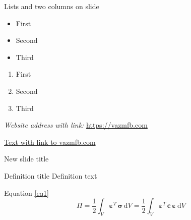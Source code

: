 \documentclass[12pt]{beamer}
\newcommand{\diff}[1]{\mathrm{d}#1}
\begin{document}
\begin{frame}{}
Lists and two columns on slide

\vspace{1cm} %

\begin{minipage}{0.49\textwidth}
    \begin{itemize}
    	\item First 
    	\item Second
    	\item Third
    \end{itemize}
\end{minipage}
\begin{minipage}{0.49\textwidth}
    \begin{enumerate}
    	\item First 
    	\item Second
    	\item Third
    \end{enumerate}
\end{minipage}

\vspace{1cm} %

\textit{Website address with link:} %
\url{https://vazmfb.com}

\href{https://vazmfb.com}{Text with link to vazmfb.com}

\end{frame}

\begin{frame}{New slide title}
\begin{vazmfb_block}{Definition title}
    Definition text
\end{vazmfb_block}

Equation \ref{eq1} %
\begin{equation}
    \label{eq1}
    \Pi = \frac{1}{2} \int_{V} \bm{\varepsilon}^T\, \bm{\sigma}\, \text{d}V = \frac{1}{2} \int_{V} \bm{\varepsilon}^T\, \bm{c}\, \bm{\varepsilon}\, \diff{V}
\end{equation}

\end{frame}
\end{document}
